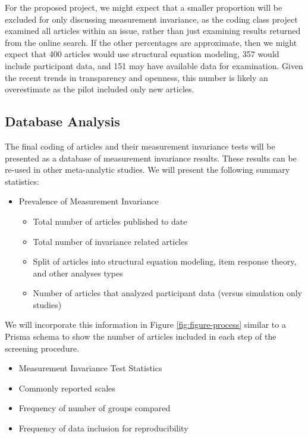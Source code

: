 \documentclass[
  english,
  man]{apa7}
\providecommand{\tightlist}{%
  \setlength{\itemsep}{0pt}\setlength{\parskip}{0pt}}
\begin{document}
For the proposed project, we might expect that a smaller proportion will be excluded for only discussing measurement invariance, as the coding class project examined all articles within an issue, rather than just examining results returned from the online search. If the other percentages are approximate, then we might expect that 400 articles would use structural equation modeling, 357 would include participant data, and 151 may have available data for examination. Given the recent trends in transparency and openness, this number is likely an overestimate as the pilot included only new articles.

\subsection{Database Analysis}\label{database-analysis}

The final coding of articles and their measurement invariance tests will be presented as a database of measurement invariance results. These results can be re-used in other meta-analytic studies. We will present the following summary statistics:

\begin{itemize}
\tightlist
\item
  Prevalence of Measurement Invariance

  \begin{itemize}
  \tightlist
  \item
    Total number of articles published to date
  \item
    Total number of invariance related articles
  \item
    Split of articles into structural equation modeling, item response theory, and other analyses types
  \item
    Number of articles that analyzed participant data (versus simulation only studies)
  \end{itemize}
\end{itemize}

We will incorporate this information in Figure \ref{fig:figure-process} similar to a Prisma schema to show the number of articles included in each step of the screening procedure.

\begin{itemize}
\tightlist
\item
  Measurement Invariance Test Statistics
\item
  Commonly reported scales
\item
  Frequency of number of groups compared
\item
  Frequency of data inclusion for reproducibility
\end{itemize}
\end{document}

